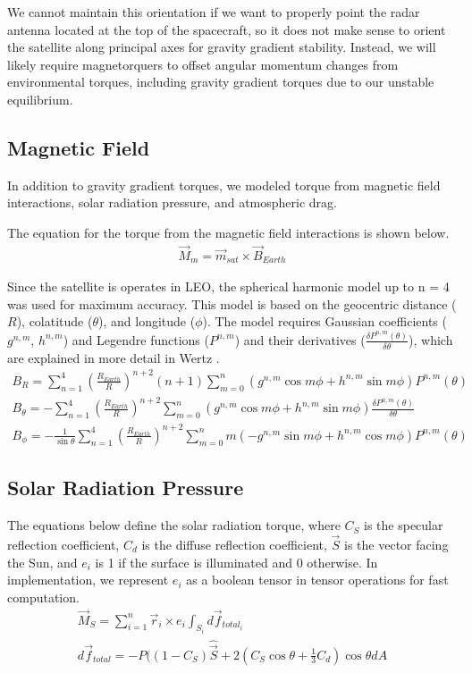 We cannot maintain this orientation if we want to properly point the radar antenna located at the top of the spacecraft, so it does not make sense to orient the satellite along principal axes for gravity gradient stability. Instead, we will likely require magnetorquers to offset angular momentum changes from environmental torques, including gravity gradient torques due to our unstable equilibrium.

\subsection{Magnetic Field}
In addition to gravity gradient torques, we modeled torque from magnetic field interactions, solar radiation pressure, and atmospheric drag.

The equation for the torque from the magnetic field interactions is shown below.
\begin{align*}
    \Vec{M}_{m} = \Vec{m}_{sat} \times \Vec{B}_{Earth}
\end{align*}

Since the satellite is operates in LEO, the spherical harmonic model up to n = 4 was used for maximum accuracy. This model is based on the geocentric distance ($R$), colatitude ($\theta$), and longitude ($\phi$). The model requires Gaussian coefficients ($g^{n,m}$, $h^{n,m}$) and Legendre functions ($P^{n,m}$) and their derivatives ($\frac{\delta P^{n,m} (\theta)}{\delta \theta}$), which are explained in more detail in Wertz \cite{Wertz}.
\begin{align*}
    B_R = \sum^{4}_{n=1} (\frac{R_{Earth}}{R})^{n+2} (n+1) \sum^{n}_{m=0}
    (g^{n,m} \cos{m \phi} + h^{n,m} \sin{m \phi}) P^{n,m}(\theta) \\
    B_{\theta} = - \sum^{4}_{n=1} (\frac{R_{Earth}}{R})^{n+2} \sum^{n}_{m=0}
    (g^{n,m} \cos{m \phi} + h^{n,m} \sin{m \phi}) \frac{\delta P^{n,m} (\theta)}{\delta \theta} \\
    B_{\phi} = - \frac{1}{\sin{\theta}} \sum^{4}_{n=1} (\frac{R_{Earth}}{R})^{n+2}
    \sum^{n}_{m=0} m (-g^{n,m} \sin{m \phi} + h^{n,m} \cos{m \phi}) P^{n,m}(\theta)
\end{align*}

\subsection{Solar Radiation Pressure}
The equations below define the solar radiation torque, where $C_S$ is the specular reflection coefficient, $C_d$ is the diffuse reflection coefficient, $\Vec{S}$ is the vector facing the Sun, and $e_i$ is 1 if the surface is illuminated and 0 otherwise. In implementation, we represent $e_i$ as a boolean tensor in tensor operations for fast computation.
\begin{align*}
    \Vec{M}_{S} = \sum^{n}_{i=1} \Vec{r}_{i} \times e_i \int_{S_i} d \Vec{f}_{total_{i}} \\
    d \Vec{f}_{total} = -P ((1-C_S) \hat{\Vec{S}} + 2 (C_S \cos{\theta} + \frac{1}{3} C_d) \cos{\theta} dA
\end{align*}

